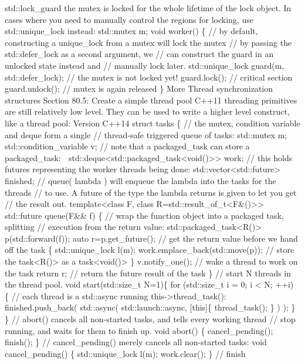 std::lock\_guard the mutex is locked for the whole lifetime of the lock
object. In cases where you need to manually control the regions for
locking, use std::unique\_lock instead: std::mutex m; void worker() \{
// by default, constructing a unique\_lock from a mutex will lock the
mutex // by passing the std::defer\_lock as a second argument, we // can
construct the guard in an unlocked state instead and // manually lock
later. std::unique\_lock guard(m, std::defer\_lock); // the mutex is not
locked yet! guard.lock(); // critical section guard.unlock(); // mutex
is again released \} More Thread synchronization structures Section
80.5: Create a simple thread pool C++11 threading primitives are still
relatively low level. They can be used to write a higher level
construct, like a thread pool: Version C++14 struct tasks \{ // the
mutex, condition variable and deque form a single // thread-safe
triggered queue of tasks: std::mutex m; std::condition\_variable v; //
note that a packaged\_task can store a packaged\_task: 
std::deque\textless std::packaged\_task\textless void()\textgreater\textgreater{}
work; // this holds futures representing the worker threads being done:
std::vector\textless std::future\textgreater{} finished; // queue(
lambda ) will enqueue the lambda into the tasks for the threads // to
use. A future of the type the lambda returns is given to let you get //
the result out. template\textless class F, class
R=std::result\_of\_t\textless F\&()\textgreater\textgreater{}
std::future queue(F\&\& f) \{ // wrap the function object into a
packaged task, splitting // execution from the return value:
std::packaged\_task\textless R()\textgreater{} p(std::forward(f)); auto
r=p.get\_future(); // get the return value before we hand off the task
\{ std::unique\_lock l(m); work.emplace\_back(std::move(p)); // store
the task\textless R()\textgreater{} as a
task\textless void()\textgreater{} \} v.notify\_one(); // wake a thread
to work on the task return r; // return the future result of the task \}
// start N threads in the thread pool. void start(std::size\_t N=1)\{
for (std::size\_t i = 0; i \textless{} N; ++i) \{ // each thread is a
std::async running this-\textgreater thread\_task():
finished.push\_back( std::async( std::launch::async, {[}this{]}\{
thread\_task(); \} ) ); \} \} // abort() cancels all non-started tasks,
and tells every working thread // stop running, and waits for them to
finish up. void abort() \{ cancel\_pending(); finish(); \} //
cancel\_pending() merely cancels all non-started tasks: void
cancel\_pending() \{ std::unique\_lock l(m); work.clear(); \} // finish
